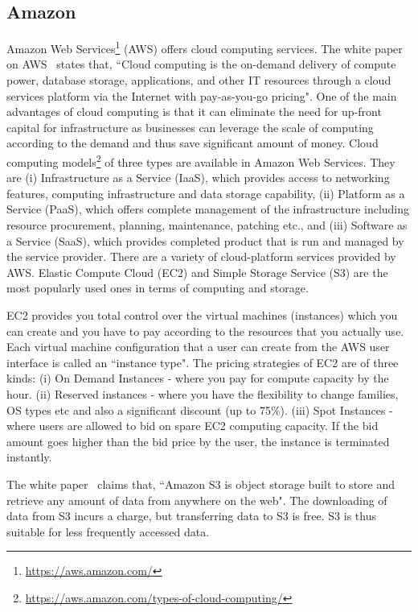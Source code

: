 \subsection{Amazon}
Amazon Web Services\footnote{\url{https://aws.amazon.com/}} (AWS) 
offers cloud computing services. The white paper on 
AWS~\cite{Amazon-Web-Services} states that, ``Cloud computing is the 
on-demand delivery of compute power, database storage, applications, 
and other IT resources through a cloud services platform via the 
Internet with pay-as-you-go pricing". One of the main advantages of 
cloud computing is that it can eliminate the need for up-front capital 
for infrastructure as businesses can leverage the scale of computing 
according to the demand and thus save significant amount of money. 
Cloud computing models\footnote{\url{https://aws.amazon.com/types-of-cloud-computing/}} 
of three types are available in Amazon Web Services. They are (i) Infrastructure as a Service (IaaS), which provides access to 
networking features, computing infrastructure and data storage 
capability, (ii) Platform as a Service (PaaS), which offers complete 
management of the infrastructure including resource procurement, 
planning, maintenance, patching etc., and (iii) Software as a Service 
(SaaS), which provides completed product that is run and managed by the 
service provider. There are a variety of cloud-platform services 
provided by AWS. Elastic Compute Cloud (EC2) and Simple Storage Service 
(S3) are the most popularly used ones in terms of computing and storage.

EC2 provides you total control over the virtual machines (instances) which you can create and you have to pay according to the resources that you actually use. Each virtual machine configuration that a user can create from the AWS user interface is called an ``instance type". The pricing strategies of EC2 are of three kinds: (i) On Demand Instances - where you pay for compute capacity by the hour. (ii) Reserved instances - where you have the flexibility to change families, OS types etc and also a significant discount (up to 75\%). (iii) Spot Instances - where users are allowed to bid on spare EC2 computing capacity. If the bid amount goes higher than the bid price by the user, the instance is terminated instantly.

The white paper~\cite{Amazon-Web-Services} claims that, ``Amazon S3 is object storage built to store and retrieve any amount of data from anywhere on the web". The downloading of data from S3 incurs a charge, but transferring data to S3 is free. S3 is thus suitable for less frequently accessed data.

